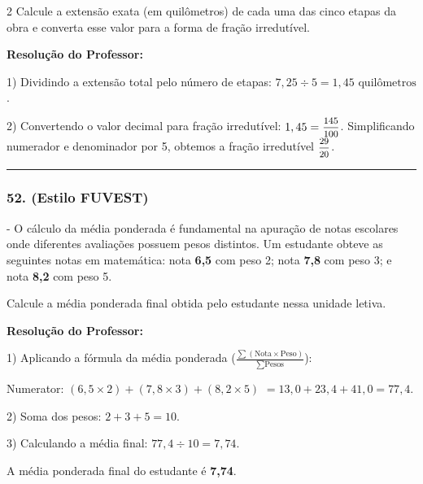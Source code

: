 \begin{multicols*}{2}
Calcule a extensão exata (em quilômetros) de cada uma das cinco etapas da obra e converta esse valor para a forma de fração irredutível.

\ifgabarito
    \begin{tcolorbox}[colback=CorTitUm!5, colframe=CorTitUm, boxrule=1pt, arc=4pt, left=6pt, right=6pt, top=6pt, bottom=6pt]
    \small\textbf{\textcolor{CorTitUm}{Resolução do Professor:}}\par\vspace{0.1cm}
    \color{CinzaEscuro}
    1) Dividindo a extensão total pelo número de etapas:
    $7,25 \div 5 = 1,45\text{ quilômetros}$.
    
    2) Convertendo o valor decimal para fração irredutível:
    $1,45 = \mfrac{145}{100}$. Simplificando numerador e denominador por 5, obtemos a fração irredutível $\mfrac{29}{20}$.
    \end{tcolorbox}
\fi

\par\vspace{\espacoQuestao}

\noindent\textcolor{CorLinha}{\rule{\linewidth}{0.5pt}} 
\par\vspace{\espacoPreQuestao}
\subsubsection*{52. (Estilo FUVEST)} - O cálculo da média ponderada é fundamental na apuração de notas escolares onde diferentes avaliações possuem pesos distintos. Um estudante obteve as seguintes notas em matemática: nota \textbf{6,5} com peso 2; nota \textbf{7,8} com peso 3; e nota \textbf{8,2} com peso 5.

Calcule a média ponderada final obtida pelo estudante nessa unidade letiva.

\ifgabarito
    \begin{tcolorbox}[colback=CorTitUm!5, colframe=CorTitUm, boxrule=1pt, arc=4pt, left=6pt, right=6pt, top=6pt, bottom=6pt]
    \small\textbf{\textcolor{CorTitUm}{Resolução do Professor:}}\par\vspace{0.1cm}
    \color{CinzaEscuro}
    1) Aplicando a fórmula da média ponderada ($\frac{\sum (\text{Nota} \times \text{Peso})}{\sum \text{Pesos}}$):
    
    Numerator: $(6,5 \times 2) + (7,8 \times 3) + (8,2 \times 5)$
    $= 13,0 + 23,4 + 41,0 = 77,4$.
    
    2) Soma dos pesos:
    $2 + 3 + 5 = 10$.
    
    3) Calculando a média final:
    $77,4 \div 10 = 7,74$.
    
    A média ponderada final do estudante é \textbf{7,74}.
    \end{tcolorbox}
\fi

\par\vspace{\espacoQuestao}
\end{multicols*}
